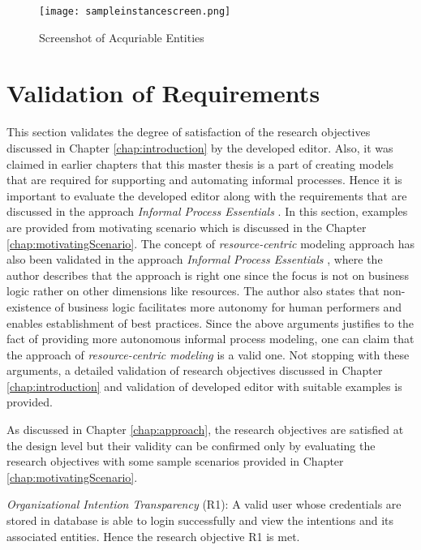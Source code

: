 \begin{figure}
	\centering
	\texttt{[image: sampleinstancescreen.png]}
	\caption{Screenshot of Acquriable Entities}
	\label{fig:realizationofinstances}
\end{figure}

		
\section{Validation of Requirements}
\label{sec:validation}
This section validates the degree of satisfaction of the research objectives discussed in Chapter \ref{chap:introduction} by the developed editor. Also, it was claimed in earlier chapters that this master thesis is a part of creating models that are required for supporting and automating informal processes. Hence it is important to evaluate the developed editor along with the requirements that are discussed in the approach \textit{Informal Process Essentials} \cite{Sungur2014a}. In this section, examples are provided from motivating scenario which is discussed in the Chapter \ref{chap:motivatingScenario}. The concept of \textit{resource-centric} modeling approach has also been validated in the approach \textit{Informal Process Essentials} \cite{Sungur2014a}, where the author describes that the approach is right one since the focus is not on business logic rather on other dimensions like resources. The author also states that non-existence of business logic facilitates more autonomy for human performers and enables establishment of best practices. Since the above arguments justifies to the fact of providing more autonomous informal process modeling, one can claim that the approach of \textit{resource-centric modeling} is a valid one. Not stopping with these arguments, a detailed validation of research objectives discussed in Chapter \ref{chap:introduction} and validation of developed editor with suitable examples is provided.
		
As discussed in Chapter \ref{chap:approach}, the research objectives are satisfied at the design level but their validity can be confirmed only by evaluating the research objectives with some sample scenarios provided in Chapter \ref{chap:motivatingScenario}.   

\textit{Organizational Intention Transparency} (R1): A valid user whose credentials are stored in database is able to login successfully and view the intentions and its associated entities. Hence the research objective R1 is met.

